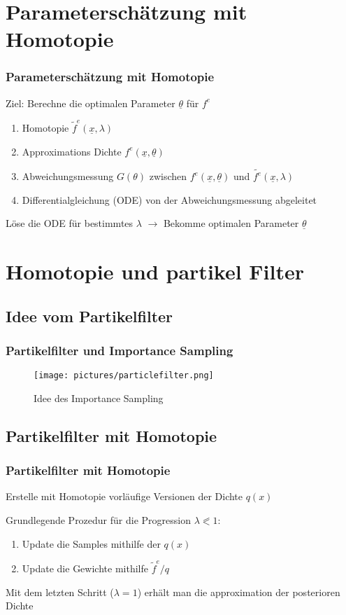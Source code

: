 \documentclass[18pt]{beamer}
\begin{document}
\section{Parameterschätzung mit Homotopie}
\begin{frame}
    \frametitle{Parameterschätzung mit Homotopie}
    Ziel: Berechne die optimalen Parameter $\underline{\theta}$ für $f^{e}$
    \begin{enumerate}
        \item Homotopie $\tilde{f}^{e}(\underline{x},\lambda)$
        \item Approximations Dichte $f^e(\underline{x}, \underline{\theta})$ 
        \item Abweichungsmessung $G(\theta)$ zwischen $f^e(\underline{x}, \underline{\theta})$ und $\tilde{f^e}(\underline{x},\lambda)$
        \item Differentialgleichung (ODE) von der Abweichungsmessung abgeleitet
    \end{enumerate}
    \vspace{15pt}
    \centering
    Löse die ODE für bestimmtes $\lambda$ $\rightarrow$ Bekomme optimalen Parameter $\underline{\theta}$
\end{frame}



\section{Homotopie und partikel Filter}

\subsection{Idee vom Partikelfilter}
\begin{frame}
    \frametitle{Partikelfilter und Importance Sampling}
    \begin{figure}[]
        \centering
        \texttt{[image: pictures/particlefilter.png]}
        \caption{Idee des Importance Sampling}
    \end{figure}

\end{frame}

\subsection{Partikelfilter mit Homotopie}
\begin{frame}
    \frametitle{Partikelfilter mit Homotopie}
    Erstelle mit Homotopie vorläufige Versionen der Dichte $q(x)$

    \vspace{15pt}
    Grundlegende Prozedur für die Progression $\lambda \eqslantless 1$:
    \begin{enumerate}
        \item Update die Samples mithilfe der $q(x)$
        \item Update die Gewichte mithilfe $\tilde{f}^{e}/q$
    \end{enumerate}
    \vspace{15pt}
    Mit dem letzten Schritt ($\lambda = 1$) erhält man die approximation der posterioren Dichte
\end{frame}
\end{document}
